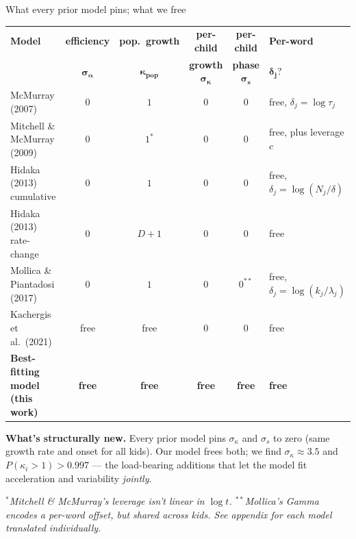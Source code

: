 \documentclass[
  ignorenonframetext,
  aspectratio=169,
  t]{beamer}
\renewcommand{\arraystretch}{1.10}
\newcommand{\kappap}{\kappa_{\text{pop}}}
\begin{document}
\begin{frame}{What every prior model pins; what we free}
\label{what-every-prior-model-pins-what-we-free}
\centering
\scriptsize
\renewcommand{\arraystretch}{1.30}
\begin{tabular}{@{}lccccl@{}}
\toprule
\textbf{Model} & \textbf{efficiency} & \textbf{pop.\ growth} & \textbf{per-child} & \textbf{per-child} & \textbf{Per-word} \\
              & $\boldsymbol{\sigma_\alpha}$ & $\boldsymbol{\kappap}$ & \textbf{growth} $\boldsymbol{\sigma_\kappa}$ & \textbf{phase} $\boldsymbol{\sigma_s}$ & $\boldsymbol{\delta_j}$? \\
\midrule
McMurray (2007)              & $0$    & $1$     & $0$ & $0$ & free, $\delta_j = \log\tau_j$ \\
Mitchell \& McMurray (2009)  & $0$    & $1^{*}$ & $0$ & $0$ & free, plus leverage $c$ \\
Hidaka (2013) cumulative     & $0$    & $1$     & $0$ & $0$ & free, $\delta_j = \log(N_j/\delta)$ \\
Hidaka (2013) rate-change    & $0$    & $D{+}1$ & $0$ & $0$ & free \\
Mollica \& Piantadosi (2017) & $0$    & $1$     & $0$ & $0^{**}$ & free, $\delta_j = \log(k_j/\lambda_j)$ \\
Kachergis et al.\ (2021)     & free   & free    & $0$ & $0$ & free \\
\midrule
\textbf{Best-fitting model (this work)} & \textbf{free} & \textbf{free} & \textbf{free} & \textbf{free} & \textbf{free} \\
\bottomrule
\end{tabular}

\vspace{0.6em}
\footnotesize

\textbf{What's structurally new.} Every prior model pins
\(\sigma_\kappa\) and \(\sigma_s\) to zero (same growth rate and onset
for all kids). Our model frees both; we find
\(\sigma_\kappa \approx 3.5\) and \(P(\kappa_i > 1) > 0.997\) --- the
load-bearing additions that let the model fit acceleration and
variability \emph{jointly}.

\vspace{0.2em}

\scriptsize\color{black!55}\textit{$^{*}$Mitchell \& McMurray's leverage
isn't linear in $\log t$. $^{**}$Mollica's Gamma encodes a per-word
offset, but shared across kids. See appendix for each model translated
individually.}
\end{frame}
\end{document}
